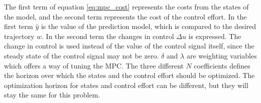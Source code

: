 The first term of equation \ref{eq:mpc_cost} represents the costs from the states of the model, and the second term represents the cost of the control effort. In the first term $\hat{y}$ is the value of the prediction model, which is compared to the desired trajectory $w$. In the second term the changes in control $\Delta u$ is expressed. The change in control is used instead of the value of the control signal itself, since the steady state of the control signal may not be zero. $\delta$ and $\lambda$ are weighting variables which offers a way of tuning the MPC. The three different $N$ coefficients defines the horizon over which the states and the control effort should be optimized. The optimization horizon for states and control effort can be different, but they will stay the same for this problem.